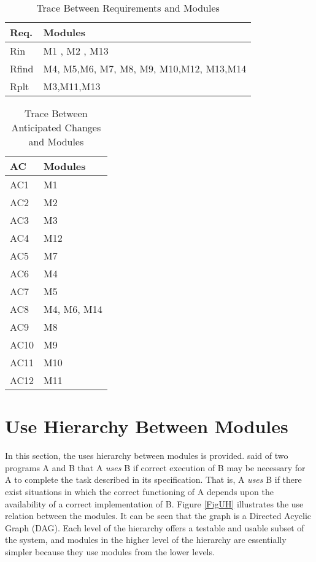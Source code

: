\documentclass[12pt, titlepage]{article}
\begin{document}
	\begin{table}[H]
		\centering
		\begin{tabular}{p{} p{}}
			\toprule
			\textbf{Req.} & \textbf{Modules}\\
			\midrule
			Rin & M1 , M2 , M13\\
			Rfind & M4, M5,M6, M7, M8, M9, M10,M12, M13,M14\\
			Rplt & M3,M11,M13 \\
			\bottomrule
		\end{tabular}
		\caption{Trace Between Requirements and Modules}
		\label{TblRT}
	\end{table}
	
	\begin{table}[H]
		\centering
		\begin{tabular}{p{} p{}}
			\toprule
			\textbf{AC} & \textbf{Modules}\\
			\midrule
			AC1 & M1\\
			AC2 & M2\\
			AC3 & M3\\
			AC4 & M12\\
			AC5 & M7\\ 
			AC6 & M4\\ 
			AC7 & M5\\ 
			AC8 & M4, M6, M14\\ 
			AC9 & M8\\ 
			AC10 & M9\\
			AC11 & M10\\ 
			AC12 & M11\\
			\bottomrule
		\end{tabular}
		\caption{Trace Between Anticipated Changes and Modules}
		\label{TblACT}
	\end{table}
	
	\section{Use Hierarchy Between Modules} \label{SecUse}
	
	In this section, the uses hierarchy between modules is
	provided. \citet{Parnas1978} said of two programs A and B that A {\em uses} 
	B if
	correct execution of B may be necessary for A to complete the task 
	described in
	its specification. That is, A {\em uses} B if there exist situations in 
	which
	the correct functioning of A depends upon the availability of a correct
	implementation of B.  Figure \ref{FigUH} illustrates the use relation 
	between
	the modules. It can be seen that the graph is a Directed Acyclic Graph
	(DAG). Each level of the hierarchy offers a testable and usable subset of 
	the
	system, and modules in the higher level of the hierarchy are essentially 
	simpler
	because they use modules from the lower levels. \\
	
\end{document}

